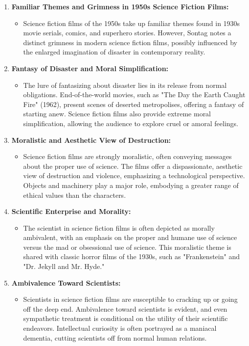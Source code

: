 \documentclass[11pt,fleqn]{book}
\begin{document}
\begin{enumerate}[label=\arabic*.]
    \item \textbf{Familiar Themes and Grimness in 1950s Science Fiction Films:}
    \begin{itemize}
        \item Science fiction films of the 1950s take up familiar themes found in 1930s movie serials, comics, and superhero stories. However, Sontag notes a distinct grimness in modern science fiction films, possibly influenced by the enlarged imagination of disaster in contemporary reality.
    \end{itemize}

    \item \textbf{Fantasy of Disaster and Moral Simplification:}
    \begin{itemize}
        \item The lure of fantasizing about disaster lies in its release from normal obligations. End-of-the-world movies, such as "The Day the Earth Caught Fire" (1962), present scenes of deserted metropolises, offering a fantasy of starting anew. Science fiction films also provide extreme moral simplification, allowing the audience to explore cruel or amoral feelings.
    \end{itemize}

    \item \textbf{Moralistic and Aesthetic View of Destruction:}
    \begin{itemize}
        \item Science fiction films are strongly moralistic, often conveying messages about the proper use of science. The films offer a dispassionate, aesthetic view of destruction and violence, emphasizing a technological perspective. Objects and machinery play a major role, embodying a greater range of ethical values than the characters.
    \end{itemize}

    \item \textbf{Scientific Enterprise and Morality:}
    \begin{itemize}
        \item The scientist in science fiction films is often depicted as morally ambivalent, with an emphasis on the proper and humane use of science versus the mad or obsessional use of science. This moralistic theme is shared with classic horror films of the 1930s, such as "Frankenstein" and "Dr. Jekyll and Mr. Hyde."
    \end{itemize}

    \item \textbf{Ambivalence Toward Scientists:}
    \begin{itemize}
        \item Scientists in science fiction films are susceptible to cracking up or going off the deep end. Ambivalence toward scientists is evident, and even sympathetic treatment is conditional on the utility of their scientific endeavors. Intellectual curiosity is often portrayed as a maniacal dementia, cutting scientists off from normal human relations.
    \end{itemize}


\end{enumerate}
\end{document}
